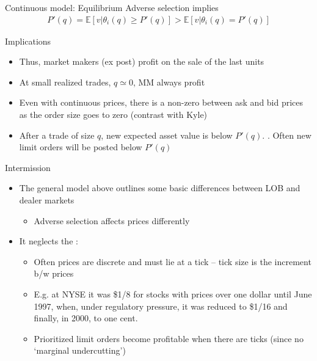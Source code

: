 \documentclass[english,10pt
,aspectratio=169
]{beamer}
\begin{document}
\begin{frame}{Continuous model: Equilibrium}
	Adverse selection implies
	\begin{align}
	P'(q) = \mathbb{E}[v|\theta_i(q) \geq P'(q)] > \mathbb{E}[v|\theta_i(q) = P'(q)]
	\end{align}
	\begin{block}{Implications}
		\begin{itemize}
			\item Thus, market makers (ex post) profit on the sale of the last units
			\item At small realized trades, $q \simeq 0$, MM always profit
			\item Even with continuous prices, there is a non-zero  between ask and bid prices as the order size goes to zero (contrast with Kyle)
			\item After a trade of size $q$, new expected asset value is below $P'(q)$. \pause {}. Often new limit orders will be posted below $P'(q)$
		\end{itemize}
	\end{block}
\end{frame}


\begin{frame}{Intermission}
	\begin{itemize}
		\item The general model above outlines some basic differences between LOB and dealer markets
		\begin{itemize}
			\item Adverse selection affects prices differently
		\end{itemize}
		\item It neglects the :
		\begin{itemize}
			\item Often prices are discrete and must lie at a tick --  tick size is the increment b/w prices
			\item E.g. at NYSE it was \$1/8 for stocks with prices over one dollar until June 1997, when, under regulatory pressure, it was reduced to \$1/16 and finally, in 2000, to one cent.
			\item Prioritized limit orders become profitable when there are ticks (since no `marginal undercutting')
		\end{itemize}
	\end{itemize}
\end{frame}
\end{document}
